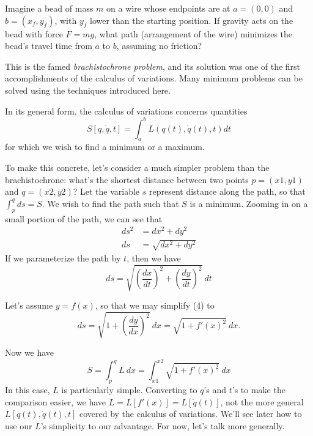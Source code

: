 \documentclass[12pt]{article}
\newcommand{\mvar}{t}
\begin{document}
Imagine a bead of mass $m$ on a wire whose endpoints are at $a = (0,0)$ and $b = (x_f, y_f)$, with $y_f$ lower than the starting position.  If gravity acts on the bead with force $F = m g$, what path (arrangement of the wire) minimizes the bead's travel time from $a$ to $b$, assuming no friction?

This is the famed \emph{brachistochrone problem}, and its solution was one of the first accomplishments of the calculus of variations.  Many minimum problems can be solved using the techniques introduced here. 

In its general form, the calculus of variations concerns quantities
\begin{equation}
S[q,\dot{q}, \mvar] = \int_{a}^{b} L(q(\mvar),\dot{q}(\mvar), \mvar) d\mvar
\end{equation}
for which we wish to find a minimum or a maximum.

To make this concrete, let's consider a much simpler problem than the brachistochrone: what's the shortest distance between two points $p = (x1,y1)$ and $q = (x2,y2)$?  Let the variable $s$ represent distance along the path, so that $\int_{p}^{q} ds = S$.  We wish to find the path such that $S$ is a minimum.  Zooming in on a small portion of the path, we can see that
\begin{align}
ds^2 &= dx^2 + dy^2\\
ds &= \sqrt{dx^2 + dy^2}
\end{align}
If we parameterize the path by $t$, then we have
\begin{equation}
ds = \sqrt{\left(\frac{dx}{dt}\right)^2 + \left(\frac{dy}{dt}\right)^2}\ dt
\end{equation}

Let's assume $y = f(x)$, so that we may simplify (4) to
\begin{equation}
ds = \sqrt{1 + \left(\frac{dy}{dx}\right)^2}\ dx = \sqrt{1 + f'(x)^2}\ dx.
\end{equation}

Now we have
\begin{equation}
S = \int_{p}^{q} L\ dx = \int_{x1}^{x2} \sqrt{1 + f'(x)^2}\ dx
\end{equation}
In this case, $L$ is particularly simple.  Converting to $q$'s and $t$'s to make the comparison easier, we have $L = L[f'(x)] = L[\dot{q}(t)]$, not the more general $L[q(t), \dot{q}(t), t]$ covered by the calculus of variations.  We'll see later how to use our $L$'s simplicity to our advantage.  For now, let's talk more generally.
\end{document}

